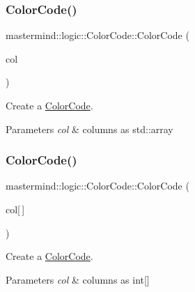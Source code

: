 \subsubsection{\texorpdfstring{Color\+Code()}{ColorCode()}\hspace{0.1cm}{\footnotesize\ttfamily [1/3]}}
{\footnotesize\ttfamily mastermind\+::logic\+::\+Color\+Code\+::\+Color\+Code (\begin{DoxyParamCaption}\item[{std\+::array$<$ int, \hyperlink{classmastermind_1_1_mastermind_ad4cfc8127641ff8dfe89d65ae232331c}{S\+L\+O\+T\+\_\+\+C\+O\+U\+NT} $>$ \&}]{col }\end{DoxyParamCaption})}



Create a \hyperlink{classmastermind_1_1logic_1_1_color_code}{Color\+Code}. 


\begin{DoxyParams}{Parameters}
{\em col} & columns as std\+::array \\
\hline
\end{DoxyParams}
\hypertarget{classmastermind_1_1logic_1_1_color_code_ac94a451ad586fc094994d647cf0ae516}{}\label{classmastermind_1_1logic_1_1_color_code_ac94a451ad586fc094994d647cf0ae516} 
\subsubsection{\texorpdfstring{Color\+Code()}{ColorCode()}\hspace{0.1cm}{\footnotesize\ttfamily [2/3]}}
{\footnotesize\ttfamily mastermind\+::logic\+::\+Color\+Code\+::\+Color\+Code (\begin{DoxyParamCaption}\item[{int}]{col\mbox{[}$\,$\mbox{]} }\end{DoxyParamCaption})}



Create a \hyperlink{classmastermind_1_1logic_1_1_color_code}{Color\+Code}. 


\begin{DoxyParams}{Parameters}
{\em col} & columns as int\mbox{[}\mbox{]} \\
\hline
\end{DoxyParams}
\hypertarget{classmastermind_1_1logic_1_1_color_code_a4ef09f85d7316ec785541ee326d3def6}{}\label{classmastermind_1_1logic_1_1_color_code_a4ef09f85d7316ec785541ee326d3def6} 
